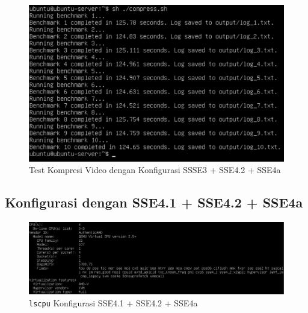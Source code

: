 \begin{figure}
    \centering
    \includegraphics[width=1\textwidth]
    {assets/pics/video-compression-test/ssse3,sse4.2,sse4a.jpeg}
    \caption{Test Kompresi Video dengan Konfigurasi SSSE3 + SSE4.2 + SSE4a}
    \label{fig:video_compression_test_ssse3,sse4.2,sse4a.jpeg}
\end{figure}

\subsection{Konfigurasi dengan SSE4.1 + SSE4.2 + SSE4a}
\begin{figure}
    \centering
    \includegraphics[width=1\textwidth]
    {assets/pics/video-compression-test/lscpu_sse4.1,sse4.2,sse4a.jpeg}
    \caption{\texttt{lscpu} Konfigurasi SSE4.1 + SSE4.2 + SSE4a}
    \label{fig:lscpu_video_compression_test_sse4.1,sse4.2,sse4a.jpeg}
\end{figure}

